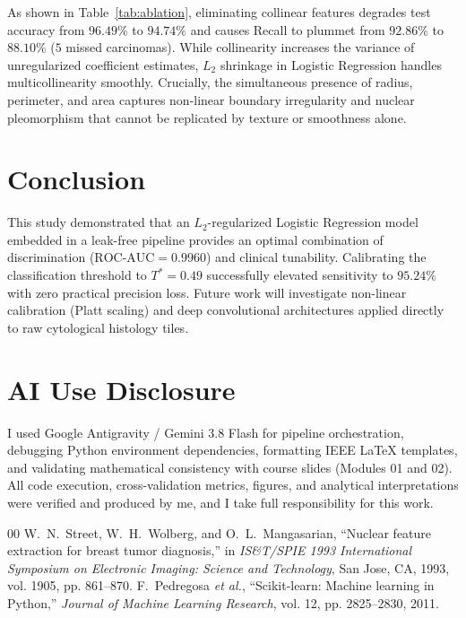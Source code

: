 \documentclass[10pt,journal,compsoc,twocolumn]{IEEEtran}
\begin{document}
As shown in Table~\ref{tab:ablation}, eliminating collinear features degrades test accuracy from $96.49\%$ to $94.74\%$ and causes Recall to plummet from $92.86\%$ to $88.10\%$ ($5$ missed carcinomas). While collinearity increases the variance of unregularized coefficient estimates, $L_2$ shrinkage in Logistic Regression handles multicollinearity smoothly. Crucially, the simultaneous presence of radius, perimeter, and area captures non-linear boundary irregularity and nuclear pleomorphism that cannot be replicated by texture or smoothness alone.

\section{Conclusion}
This study demonstrated that an $L_2$-regularized Logistic Regression model embedded in a leak-free pipeline provides an optimal combination of discrimination ($\text{ROC-AUC} = 0.9960$) and clinical tunability. Calibrating the classification threshold to $T^* = 0.49$ successfully elevated sensitivity to $95.24\%$ with zero practical precision loss. Future work will investigate non-linear calibration (Platt scaling) and deep convolutional architectures applied directly to raw cytological histology tiles.

\section*{AI Use Disclosure}
I used Google Antigravity / Gemini 3.8 Flash for pipeline orchestration, debugging Python environment dependencies, formatting IEEE LaTeX templates, and validating mathematical consistency with course slides (Modules 01 and 02). All code execution, cross-validation metrics, figures, and analytical interpretations were verified and produced by me, and I take full responsibility for this work.

\begin{thebibliography}{00}
W.~N.~Street, W.~H.~Wolberg, and O.~L.~Mangasarian, ``Nuclear feature extraction for breast tumor diagnosis,'' in \textit{IS\&T/SPIE 1993 International Symposium on Electronic Imaging: Science and Technology}, San Jose, CA, 1993, vol. 1905, pp. 861--870.
F.~Pedregosa \textit{et al.}, ``Scikit-learn: Machine learning in Python,'' \textit{Journal of Machine Learning Research}, vol. 12, pp. 2825--2830, 2011.
\end{thebibliography}
\end{document}
